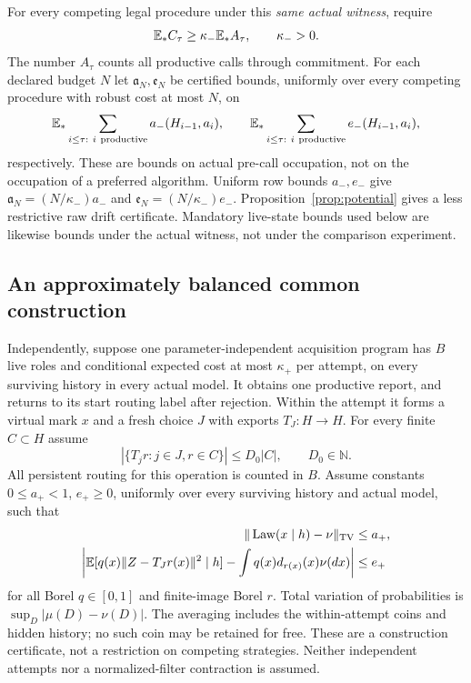 For every competing legal procedure under this \emph{same actual witness}, require
\begin{equation}\label{eq:reference-effort}
 \mathbb E_*C_\tau\ge\kappa_-\mathbb E_*A_\tau,
 \qquad \kappa_->0.
\end{equation}
The number $A_\tau$ counts all productive calls through commitment. For each declared budget $N$ let $\mathfrak a_N,\mathfrak e_N$ be certified bounds, uniformly over every competing procedure with robust cost at most $N$, on
\begin{equation}\label{eq:defect-occupation}
 \mathbb E_*\sum_{i\le\tau:\ i\ {\rm productive}}a_-(H_{i-1},a_i),\qquad
 \mathbb E_*\sum_{i\le\tau:\ i\ {\rm productive}}e_-(H_{i-1},a_i),
\end{equation}
respectively. These are bounds on actual pre-call occupation, not on the occupation of a preferred algorithm. Uniform row bounds $a_-,e_-$ give $\mathfrak a_N=(N/\kappa_-)a_-$ and $\mathfrak e_N=(N/\kappa_-)e_-$. Proposition~\ref{prop:potential} gives a less restrictive raw drift certificate. Mandatory live-state bounds used below are likewise bounds under the actual witness, not under the comparison experiment.

\subsection*{An approximately balanced common construction}
Independently, suppose one parameter-independent acquisition program has $B$ live roles and conditional expected cost at most $\kappa_+$ per attempt, on every surviving history in every actual model. It obtains one productive report, and returns to its start routing label after rejection. Within the attempt it forms a virtual mark $x$ and a fresh choice $J$ with exports $T_J:H\to H$. For every finite $C\subset H$ assume
\begin{equation}\label{eq:calibrated-export}
 |\{T_jr:j\in J,r\in C\}|\le D_0|C|,
 \qquad D_0\in\mathbb N.
\end{equation}
All persistent routing for this operation is counted in $B$. Assume constants $0\le a_+<1$, $e_+\ge0$, uniformly over every surviving history and actual model, such that
\begin{align}
 \|\operatorname{Law}(x\mid h)-\nu\|_{\mathrm{TV}}&\le a_+,\label{eq:upper-row-mass}\\
 \left|\mathbb E[q(x)\|Z-T_Jr(x)\|^2\mid h]
          -\int q(x)d_{r(x)}(x)\nu(dx)\right|&\le e_+\label{eq:upper-row-loss}
\end{align}
for all Borel $q\in[0,1]$ and finite-image Borel $r$. Total variation of probabilities is $\sup_D|\mu(D)-\nu(D)|$. The averaging includes the within-attempt coins and hidden history; no such coin may be retained for free. These are a construction certificate, not a restriction on competing strategies. Neither independent attempts nor a normalized-filter contraction is assumed.

